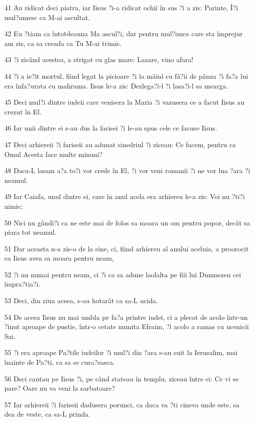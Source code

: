\par 41 Au ridicat deci piatra, iar Iisus ?i-a ridicat ochii în sus ?i a zis: Parinte, Î?i mul?umesc ca M-ai ascultat.
\par 42 Eu ?tiam ca întotdeauna Ma ascul?i, dar pentru mul?imea care sta împrejur am zis, ca sa creada ca Tu M-ai trimis.
\par 43 ?i zicând acestea, a strigat cu glas mare: Lazare, vino afara!
\par 44 ?i a ie?it mortul, fiind legat la picioare ?i la mâini cu fâ?ii de pânza ?i fa?a lui era înfa?urata cu mahrama. Iisus le-a zis: Dezlega?i-l ?i lasa?i-l sa mearga.
\par 45 Deci mul?i dintre iudeii care venisera la Maria ?i vazusera ce a facut Iisus au crezut în El.
\par 46 Iar unii dintre ei s-au dus la farisei ?i le-au spus cele ce facuse Iisus.
\par 47 Deci arhiereii ?i fariseii au adunat sinedriul ?i ziceau: Ce facem, pentru ca Omul Acesta face multe minuni?
\par 48 Daca-L lasam a?a to?i vor crede în El, ?i vor veni romanii ?i ne vor lua ?ara ?i neamul.
\par 49 Iar Caiafa, unul dintre ei, care în anul acela era arhiereu le-a zis: Voi nu ?ti?i nimic;
\par 50 Nici nu gândi?i ca ne este mai de folos sa moara un om pentru popor, decât sa piara tot neamul.
\par 51 Dar aceasta n-a zis-o de la sine, ci, fiind arhiereu al anului aceluia, a proorocit ca Iisus avea sa moara pentru neam,
\par 52 ?i nu numai pentru neam, ci ?i ca sa adune laolalta pe fiii lui Dumnezeu cei împra?tia?i.
\par 53 Deci, din ziua aceea, s-au hotarât ca sa-L ucida.
\par 54 De aceea Iisus nu mai umbla pe fa?a printre iudei, ci a plecat de acolo într-un ?inut aproape de pustie, într-o cetate numita Efraim, ?i acolo a ramas cu ucenicii Sai.
\par 55 ?i era aproape Pa?tile iudeilor ?i mul?i din ?ara s-au suit la Ierusalim, mai înainte de Pa?ti, ca sa se cura?easca.
\par 56 Deci cautau pe Iisus ?i, pe când stateau în templu, ziceau între ei: Ce vi se pare? Oare nu va veni la sarbatoare?
\par 57 Iar arhiereii ?i fariseii dadusera porunci, ca daca va ?ti cineva unde este, sa dea de veste, ca sa-L prinda.

